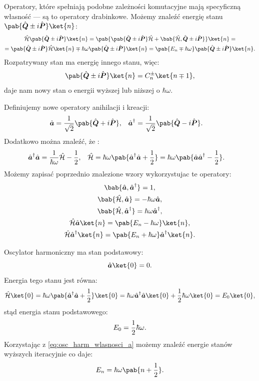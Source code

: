 Operatory, które spełniają podobne zależności komutacyjne mają specyficzną własność --- są to operatory drabinkowe. Możemy znaleźć energię stanu \(\pab{\vu{Q} \pm i\vu{P}}\ket{n}\):
\begin{multline*}
	\ham \pab{\vu{Q} \pm i\vu{P}} \ket{n} =
	\pab{\pab{\vu{Q} \pm i\vu{P}} \ham + \bab{\ham,\vu{Q} \pm i\vu{P}}} \ket{n} = \\ =
	\pab{\vu{Q} \pm i\vu{P}} \ham \ket{n} \mp \hbar\omega \pab{\vu{Q} \pm i\vu{P}} \ket{n} =
	\pab{E_n \mp \hbar\omega} \pab{\vu{Q} \pm i\vu{P}} \ket{n}.
\end{multline*}
Rozpatrywany stan ma energię innego stanu, więc:
\begin{equation*}
	\pab{\vu{Q} \pm i\vu{P}}\ket{n} = C_n^{\pm} \ket{n \mp 1},
\end{equation*}
daje nam nowy stan o energii wyższej lub niższej o \(\hbar\omega\).

Definiujemy nowe operatory anihilacji i kreacji:
\begin{align*}
	\vu{a} &= \inv{\sqrt{2}} \pab{\vu{Q} + i\vu{P}}, &
	\vu{a}^{\dagger} &= \inv{\sqrt{2}} \pab{\vu{Q} - i\vu{P}}.
\end{align*}
Dodatkowo można znaleźć, że \cite{Louisell}:
\begin{align*}
	\vu{a}^{\dagger}\vu{a} &= \inv{\hbar\omega}\ham - \inv{2}, &
	\ham &= \hbar\omega \pab{\vu{a}^{\dagger}\vu{a} + \inv{2}} =
	\hbar\omega \pab{\vu{a}\vu{a}^{\dagger} - \inv{2}}.
\end{align*}
Możemy zapisać poprzednio znalezione wzory wykorzystujac te operatory:
\begin{gather}\label{eq:osc_harm_wlasnosci_a}
	\bab{\vu{a},\vu{a}^{\dagger}} = 1, \\
	\bab{\ham,\vu{a}} = - \hbar\omega \vu{a}, \\
	\bab{\ham,\vu{a}^{\dagger}} = \hbar\omega \vu{a}^{\dagger}, \\
	\ham \vu{a} \ket{n} = \pab{E_n - \hbar\omega} \ket{n}, \\
	\ham \vu{a}^{\dagger} \ket{n} = \pab{E_n + \hbar\omega} \vu{a}^{\dagger} \ket{n}.
\end{gather}

Oscylator harmoniczny ma stan podstawowy:
\begin{equation*}
	\vu{a} \ket{0} = 0.
\end{equation*}
Energia tego stanu jest równa:
\begin{equation*}
	\ham \ket{0} =
	\hbar\omega \pab{\vu{a}^{\dagger}\vu{a} + \inv{2}} \ket{0} =
	\hbar\omega \vu{a}^{\dagger}\vu{a} \ket{0} + \inv{2}\hbar\omega \ket{0} =
	E_0 \ket{0},
\end{equation*}
stąd energia stanu podstawowego:
\begin{equation*}
	E_0 = \frac{1}{2}\hbar\omega.
\end{equation*}
Korzystając z \eqref{eq:osc_harm_wlasnosci_a} możemy znaleźć energie stanów wyższych iteracyjnie co daje:
\begin{equation}\label{eq:osc_harm_En}
	E_n = \hbar\omega \pab{n + \inv{2}}.
\end{equation}

